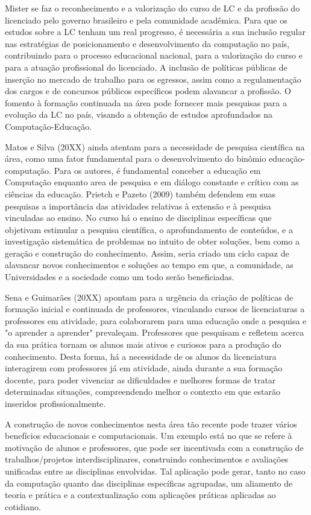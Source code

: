     
    Mister se faz o reconhecimento e a valorização do curso de LC e da profissão do licenciado pelo  governo brasileiro e pela comunidade acadêmica. Para que os estudos sobre a LC tenham um real progresso, é necessária a sua inclusão regular nas estratégias de posicionamento e desenvolvimento da computação no país, contribuindo para o processo educacional nacional, para a valorização do curso e para a atuação profissional do licenciado. A inclusão de políticas públicas de inserção no mercado de trabalho para os egressos, assim como a regulamentação dos cargos e de concursos públicos específicos podem alavancar a profissão. O fomento à formação continuada na área pode fornecer mais pesquisas para a evolução da LC no país, visando a obtenção de estudos aprofundados na Computação-Educação.
	
    
    Matos e Silva (20XX) ainda atentam para a necessidade de pesquisa científica na área, como uma fator fundamental para o desenvolvimento do binômio educação-computação. Para os autores, é fundamental conceber a educação em Computação enquanto area de pesquisa e em diálogo constante e crítico com as ciências da educação. Prietch e Pazeto (2009) também defendem em suas pesquisas a importância das  atividades relativas à extensão e à pesquisa vinculadas ao ensino. No curso há o ensino de disciplinas específicas que objetivam estimular a pesquisa científica, o aprofundamento de conteúdos, e a investigação sistemática de problemas no intuito de obter soluções, bem como a geração e construção do conhecimento. Assim, seria criado um ciclo capaz de alavancar novos conhecimentos e soluções ao tempo em que, a comunidade, as Universidades e a sociedade como um todo serão beneficiadas.
	
    
    Sena e Guimarães (20XX) apontam para a urgência da criação de políticas de formação inicial e continuada de professores, vinculando cursos de licenciaturas a professores em atividade, para colaborarem para uma educação onde a pesquisa e "o aprender a aprender" prevaleçam. Professores que pesquisam e refletem acerca da sua prática tornam os alunos mais ativos e curiosos para a produção do conhecimento. Desta forma, há a necessidade de os alunos da licenciatura interagirem com professores já em atividade, ainda durante a sua formação docente, para poder vivenciar as dificuldades e melhores formas de tratar determinadas situações, compreendendo melhor o contexto em que estarão inseridos profissionalmente. 
	
    
    A construção de novos conhecimentos nesta área tão recente pode trazer vários benefícios educacionais e computacionais. Um exemplo está no que se refere à motivação de alunos e professores, que pode ser incentivada com a construção de trabalhos/projetos interdisciplinares, construindo conhecimentos e avaliações unificadas entre as disciplinas envolvidas. Tal aplicação pode gerar, tanto no caso da computação quanto das disciplinas específicas agrupadas, um aliamento de teoria e prática e a contextualização com aplicações práticas aplicadas ao cotidiano.
	
